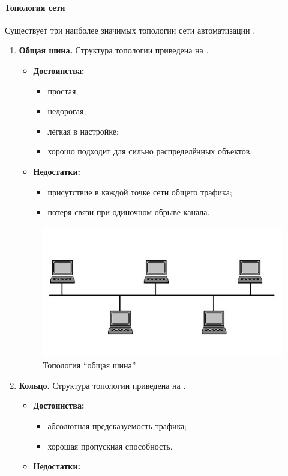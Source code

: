 \paragraph{Топология сети}\label{par:topology}
Существует три наиболее значимых топологии сети автоматизации \cite{__2001}. 
\begin{enumerate}
	\item \textbf{Общая шина.} Структура топологии приведена на .
	\begin{itemize}
		\item \textbf{Достоинства:}
		\begin{itemize}
			\item простая;
			\item недорогая;
			\item лёгкая в настройке;
			\item хорошо подходит для сильно распределённых объектов.
		\end{itemize}
		\item \textbf{Недостатки:}
		\begin{itemize}
			\item присутствие в каждой точке сети общего трафика;
			\item потеря связи при одиночном обрыве канала.
		\end{itemize}
	\end{itemize}
	\begin{figure}
		\centering
		\includegraphics[width=0.5\linewidth]{images/shina}
		\caption{Топология ``общая шина''}
		\label{fig:shina}
	\end{figure}
	\item \textbf{Кольцо.} Структура топологии приведена на .
	\begin{itemize}
		\item \textbf{Достоинства:}
		\begin{itemize}
			\item абсолютная предсказуемость трафика;
			\item хорошая пропускная способность.
		\end{itemize}
		\item \textbf{Недостатки:}

\end{itemize}
\end{enumerate}
